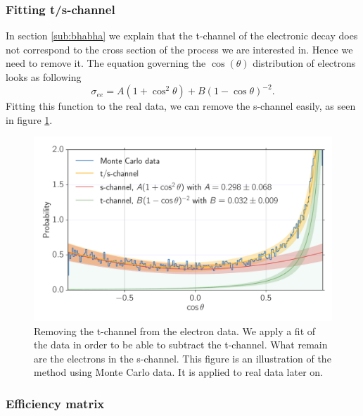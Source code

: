 \subsubsection{Fitting t/s-channel}
\label{ssub:FittingTsChannel}
In section \ref{sub:bhabha} we explain that the t-channel of the electronic decay does not correspond
to the cross section of the process we are interested in. Hence we need to remove it.  The equation governing 
the $\cos(\theta)$ distribution of electrons looks as following
\begin{equation*}
\sigma_{ee} = A(1 + \cos^2\theta) + B(1 - \cos\theta)^{-2}.
\end{equation*}
Fitting this function to the real data, we can remove the s-channel easily, as seen in figure \ref{fig:tschannel}.
\begin{figure}[htpb]
    \centering
    \includegraphics[width=1.0\linewidth]{figures/tschannel}
    \caption{Removing the t-channel from the electron data. 
        We apply a fit of the data in order to be able to subtract the t-channel. What remain are
    the electrons in the s-channel. This figure is an illustration of the method using Monte Carlo data. It is
    applied to real data later on.}
    \label{fig:tschannel}
\end{figure}
\clearpage
\subsubsection{Efficiency matrix}
\label{ssub:Efficiencymatrix}

